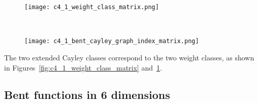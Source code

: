 \documentclass[12pt,a4paper]{article}
\begin{document}
\begin{figure}[!bhpt] %
\centering
\begin{minipage}{.48\textwidth}
  \centering
  \texttt{[image: c4\_1\_weight\_class\_matrix.png]}
  \label{fig:c4_1_weight_class_matrix}
\end{minipage}%
~~~~
\begin{minipage}{.48\textwidth}
  \centering
  \texttt{[image: c4\_1\_bent\_cayley\_graph\_index\_matrix.png]}
  \label{fig:c4_1_bent_cayley_graph_index_matrix}
\end{minipage}
\end{figure}
The two extended Cayley classes correspond to the two weight classes,
as shown in Figures~\ref{fig:c4_1_weight_class_matrix} and~\ref{fig:c4_1_bent_cayley_graph_index_matrix}.

\subsection{Bent functions in 6 dimensions}
\end{document}
